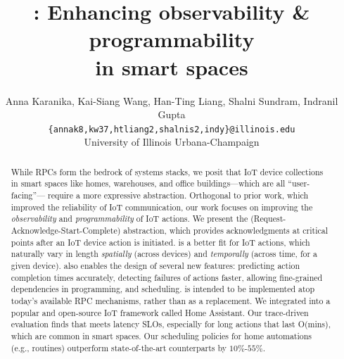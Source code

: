 \title{\abstraction{}: Enhancing observability \& programmability\\in smart spaces}

\author{
{\rm Anna Karanika, Kai-Siang Wang, Han-Ting Liang, Shalni Sundram, Indranil Gupta}\\
{\tt\{annak8,kw37,htliang2,shalnis2,indy\}@illinois.edu}\\
University of Illinois Urbana-Champaign\\
} %

\maketitle


\begin{abstract}

While RPCs form the bedrock of systems stacks, we posit that IoT device collections in smart spaces like homes, warehouses, and office buildings---which are all ``user-facing''---
require a more expressive abstraction.
{Orthogonal to prior work, which improved the {reliability} of IoT communication, our work focuses on improving the {\it observability} and {\it programmability} of IoT actions.}
We present the \abstraction{} (Request-Acknowledge-Start-Complete) abstraction, which provides acknowledgments at critical points after an IoT device action is initiated. \abstraction{}   is a better fit for %
IoT actions, which naturally vary in length {\it spatially} (across devices) and {\it temporally} (across time, for a given device).
\abs{} also enables the design of several new features: predicting action completion times accurately, detecting failures of actions faster, allowing fine-grained dependencies in programming, and scheduling.
\abs{} is intended to be implemented atop today's available RPC mechanisms, rather than as a replacement. We integrated \abs{} into a popular and open-source IoT framework called Home Assistant.
Our trace-driven evaluation finds that \abstraction{} meets latency SLOs,
especially for long actions that last  O(mins), which are common in smart spaces.
Our scheduling policies for home automations (e.g., routines) outperform state-of-the-art counterparts by $10\%$-$55\%$.
\end{abstract}
